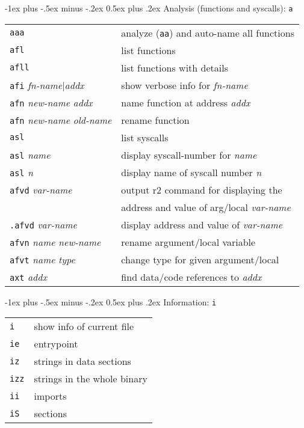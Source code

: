 \documentclass[a4paper,landscape]{article}
\makeatletter
\renewcommand{\section}{\@startsection{section}{1}{0mm}%
                                {-1ex plus -.5ex minus -.2ex}%
                                {0.5ex plus .2ex}%
                                {\normalfont\large\bfseries}}
\makeatother
\begin{document}
\begin{multicols*}{3}
\section{Analysis (functions and syscalls): \texttt{a}}
\begin{tabular}{@{}ll@{}}
\texttt{aaa} & analyze (\texttt{aa}) and auto-name all functions \\
\texttt{afl} & list functions \\
\texttt{afll} & list functions with details \\
\texttt{afi} \textit{fn-name}$|$\textit{addx} & show verbose info for \textit{fn-name} \\
\texttt{afn} \textit{new-name} \textit{addx} & name function at address \textit{addx} \\
\texttt{afn} \textit{new-name} \textit{old-name} & rename function \\
\texttt{asl} & list syscalls \\
\texttt{asl} \textit{name} & display syscall-number for \textit{name} \\
\texttt{asl} \textit{n} & display name of syscall number \textit{n} \\
\texttt{afvd} \textit{var-name} & output r2 command for displaying the \\ & address and value of arg/local \textit{var-name} \\
\texttt{.afvd} \textit{var-name} & display address and value of \textit{var-name} \\
\texttt{afvn} \textit{name} \textit{new-name} & rename argument/local variable \\
\texttt{afvt} \textit{name} \textit{type} & change type for given argument/local \\
\texttt{axt} \textit{addx} & find data/code references to \textit{addx} \\
\end{tabular}

\section{Information: \texttt{i}}
\begin{tabular}{@{}ll@{}}
\texttt{i} & show info of current file \\
\texttt{ie} & entrypoint \\
\texttt{iz} & strings in data sections \\
\texttt{izz} & strings in the whole binary \\
\texttt{ii} & imports \\
\texttt{iS} & sections \\
\end{tabular}


\end{multicols*}
\end{document}
